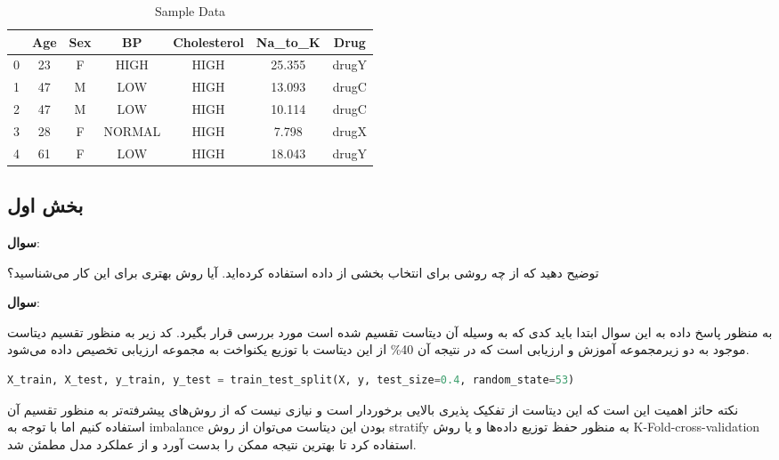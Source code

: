 \documentclass{article}
\begin{document}
\begin{table}[H]
\centering
\begin{tabular}{ccccccc}
\toprule
 & Age & Sex & BP & Cholesterol & Na\_to\_K & Drug \\
\midrule
0 & 23 & F & HIGH & HIGH & 25.355 & drugY \\
1 & 47 & M & LOW & HIGH & 13.093 & drugC \\
2 & 47 & M & LOW & HIGH & 10.114 & drugC \\
3 & 28 & F & NORMAL & HIGH & 7.798 & drugX \\
4 & 61 & F & LOW & HIGH & 18.043 & drugY \\
\bottomrule
\end{tabular}
\caption{Sample Data}
\label{tab:Q3 Table}
\end{table}

\subsection{بخش اول}



{\large \textbf{سوال}:} 

توضیح دهید که از چه روشی برای انتخاب بخشی از داده استفاده کرده‌اید. آیا روش بهتری برای این کار می‌شناسید؟



{\large \textbf{سوال}:} 

به منظور پاسخ داده به این سوال ابتدا باید کدی که به وسیله آن دیتاست تقسیم شده است مورد بررسی قرار بگیرد.
کد زیر به منظور تقسیم دیتاست موجود به دو زیرمجموعه آموزش و ارزیابی است که در نتیجه آن
40\% 
 از این دیتاست با توزیع یکنواخت به مجموعه ارزیابی تخصیص داده می‌شود.

\begin{LTR}
	\begin{lstlisting}[language=Python, caption=Data Selection]
		X_train, X_test, y_train, y_test = train_test_split(X, y, test_size=0.4, random_state=53)
	\end{lstlisting}
\end{LTR}

نکته حائز اهمیت این است که این دیتاست از تفکیک پذیری بالایی برخوردار است و نیازی نیست که از روش‌های پیشرفته‌تر به منظور تقسیم آن استفاده کنیم اما با توجه به 
imbalance
بودن این دیتاست می‌توان از روش 
stratify
به منظور حفظ توزیع داده‌ها و یا روش
K-Fold-cross-validation
استفاده کرد تا بهترین نتیجه ممکن را بدست آورد و از عملکرد مدل مطمئن شد.
\end{document}
